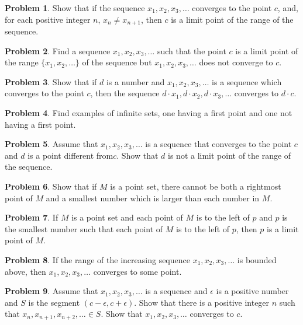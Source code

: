 \documentclass{article}
\theoremstyle{definition}
\newtheorem{problem}{Problem}
\begin{document}
\begin{problem}
Show that if the sequence $x_1, x_2, x_3, \dots$ converges to the point $c$, and, for each positive integer $n$, $x_n \neq x_{n+1}$, then $c$ is a limit point of the range of the sequence.
\end{problem}

\begin{problem}
Find a sequence $x_1, x_2, x_3, \dots$ such that the point $c$ is a limit point of the range $\{x_1, x_2, \dots \}$ of the sequence but $x_1, x_2, x_3, \dots$ does not converge to $c$. 
\end{problem}

\begin{problem}
Show that if $d$ is a number and $x_1, x_2, x_3, \dots$ is a sequence which converges to the point $c$, then the sequence $d \cdot x_1, d \cdot x_2, d \cdot x_3, \dots$ converges to $d \cdot c$.
\end{problem}

\begin{problem}
Find examples of infinite sets, one having a first point and one not having a first point.
\end{problem}

\begin{problem}
Assume that $x_1, x_2, x_3, \dots$ is a sequence that converges to the point $c$ and $d$ is a point different from$c$. Show that $d$ is not a limit point of the range of the sequence.
\end{problem}

\begin{problem}
Show that if $M$ is a point set, there cannot be both a rightmost point of $M$ and a smallest number which is larger than each number in $M$.
\end{problem}

\begin{problem}
If $M$ is a point set and each point of $M$ is to the left of $p$ and $p$ is the smallest number such that each point of $M$ is to the left of $p$, then $p$ is a limit point of $M$.
\end{problem}

\begin{problem}
If the range of the increasing sequence $x_1, x_2, x_3, \dots$ is bounded above, then $x_1, x_2, x_3, \dots$ converges to some point.
\end{problem}

\begin{problem}
Assume that $x_1, x_2, x_3, \dots$ is a sequence and $\epsilon$ is a positive number and $S$ is the segment $(c-\epsilon, c+\epsilon)$. Show that there is a positive integer $n$ such that ${x_n, x_{n+1}, x_{n+2}, \dots} \in S$. Show that $x_1, x_2, x_3, \dots$ converges to $c$.
\end{problem}
\end{document}
